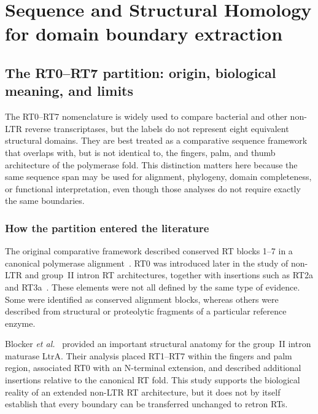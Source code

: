 \chapter{Sequence and Structural Homology for domain boundary extraction}
\label{chapter4}
\thispagestyle{empty}



\section{The RT0--RT7 partition: origin, biological meaning, and limits}
\label{sec:rt-partition-revised}

The RT0--RT7 nomenclature is widely used to compare bacterial and other
non-LTR reverse transcriptases, but the labels do not represent eight
equivalent structural domains. They are best treated as a comparative sequence
framework that overlaps with, but is not identical to, the fingers, palm, and
thumb architecture of the polymerase fold. This distinction matters here
because the same sequence span may be used for alignment, phylogeny, domain
completeness, or functional interpretation, even though those analyses do not
require exactly the same boundaries.

\subsection{How the partition entered the literature}

The original comparative framework described conserved RT blocks 1--7 in a
canonical polymerase alignment~\cite{xiong1990}. RT0 was introduced later in
the study of non-LTR and group~II intron RT architectures, together with
insertions such as RT2a and RT3a~\cite{malik1999,zimmerly2001}. These elements
were not all defined by the same type of evidence. Some were identified as
conserved alignment blocks, whereas others were described from structural or
proteolytic fragments of a particular reference enzyme.

Blocker \textit{et al.}~\cite{blocker2005} provided an important structural
anatomy for the group~II intron maturase LtrA. Their analysis placed RT1--RT7
within the fingers and palm region, associated RT0 with an N-terminal
extension, and described additional insertions relative to the canonical RT
fold. This study supports the biological reality of an extended non-LTR RT
architecture, but it does not by itself establish that every boundary can be
transferred unchanged to retron RTs.


